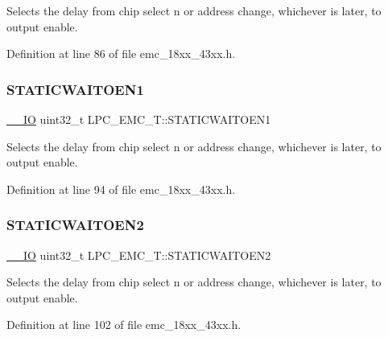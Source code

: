 Selects the delay from chip select n or address change, whichever is later, to output enable. 

Definition at line 86 of file emc\+\_\+18xx\+\_\+43xx.\+h.

\mbox{\label{struct_l_p_c___e_m_c___t_ac5735bad38453f61159eb7712a76e743}} 
\subsubsection{\texorpdfstring{S\+T\+A\+T\+I\+C\+W\+A\+I\+T\+O\+E\+N1}{STATICWAITOEN1}}
{\footnotesize\ttfamily \hyperlink{core__sc300_8h_aec43007d9998a0a0e01faede4133d6be}{\+\_\+\+\_\+\+IO} uint32\+\_\+t L\+P\+C\+\_\+\+E\+M\+C\+\_\+\+T\+::\+S\+T\+A\+T\+I\+C\+W\+A\+I\+T\+O\+E\+N1}

Selects the delay from chip select n or address change, whichever is later, to output enable. 

Definition at line 94 of file emc\+\_\+18xx\+\_\+43xx.\+h.

\mbox{\label{struct_l_p_c___e_m_c___t_ae67f91b2612e276fae8daf54579f5720}} 
\subsubsection{\texorpdfstring{S\+T\+A\+T\+I\+C\+W\+A\+I\+T\+O\+E\+N2}{STATICWAITOEN2}}
{\footnotesize\ttfamily \hyperlink{core__sc300_8h_aec43007d9998a0a0e01faede4133d6be}{\+\_\+\+\_\+\+IO} uint32\+\_\+t L\+P\+C\+\_\+\+E\+M\+C\+\_\+\+T\+::\+S\+T\+A\+T\+I\+C\+W\+A\+I\+T\+O\+E\+N2}

Selects the delay from chip select n or address change, whichever is later, to output enable. 

Definition at line 102 of file emc\+\_\+18xx\+\_\+43xx.\+h.

\mbox{\label{struct_l_p_c___e_m_c___t_abd5b0cd0ad59dee40269609b3ab34b0e}} 
